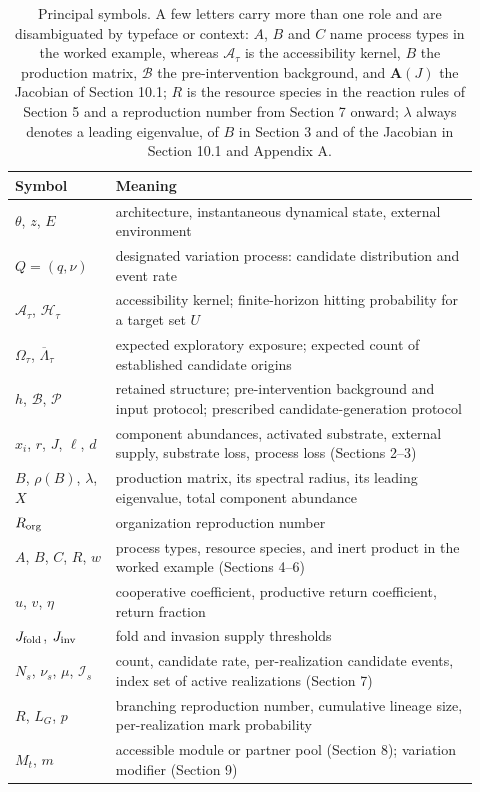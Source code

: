 \documentclass[11pt,a4paper]{article}
\begin{document}
\begin{table}[htbp]
\centering
\small
\begin{tabular}{>{\raggedright\arraybackslash}p{0.20\linewidth}>{\raggedright\arraybackslash}p{0.72\linewidth}}
\toprule
Symbol & Meaning \\
\midrule
$\theta$, $z$, $E$ & architecture, instantaneous dynamical state, external environment \\
$Q=(q,\nu)$ & designated variation process: candidate distribution and event rate \\
$\mathcal A_\tau$, $\mathcal H_\tau$ & accessibility kernel; finite-horizon hitting probability for a target set $U$ \\
$\Omega_\tau$, $\overline\Lambda_\tau$ & expected exploratory exposure; expected count of established candidate origins \\
$h$, $\mathcal B$, $\mathcal P$ & retained structure; pre-intervention background and input protocol; prescribed candidate-generation protocol \\
$x_i$, $r$, $J$, $\ell$, $d$ & component abundances, activated substrate, external supply, substrate loss, process loss (Sections 2--3) \\
$B$, $\rho(B)$, $\lambda$, $X$ & production matrix, its spectral radius, its leading eigenvalue, total component abundance \\
$R_{\rm org}$ & organization reproduction number \\
$A$, $B$, $C$, $R$, $w$ & process types, resource species, and inert product in the worked example (Sections 4--6) \\
$u$, $v$, $\eta$ & cooperative coefficient, productive return coefficient, return fraction \\
$J_{\rm fold}$, $J_{\rm inv}$ & fold and invasion supply thresholds \\
$N_s$, $\nu_s$, $\mu$, $\mathcal I_s$ & count, candidate rate, per-realization candidate events, index set of active realizations (Section 7) \\
$R$, $L_G$, $p$ & branching reproduction number, cumulative lineage size, per-realization mark probability \\
$M_t$, $m$ & accessible module or partner pool (Section 8); variation modifier (Section 9) \\
\bottomrule
\end{tabular}
\caption{Principal symbols. A few letters carry more than one role and are disambiguated by typeface or context: $A$, $B$ and $C$ name process types in the worked example, whereas $\mathcal A_\tau$ is the accessibility kernel, $B$ the production matrix, $\mathcal B$ the pre-intervention background, and $\mathbf A(J)$ the Jacobian of Section 10.1; $R$ is the resource species in the reaction rules of Section 5 and a reproduction number from Section 7 onward; $\lambda$ always denotes a leading eigenvalue, of $B$ in Section 3 and of the Jacobian in Section 10.1 and Appendix A.}
\label{tab:notation}
\end{table}
\end{document}
